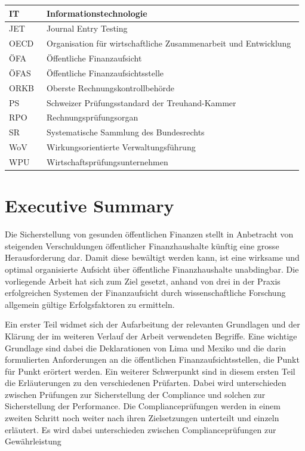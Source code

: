 \documentclass[10pt]{article}
\begin{document}
\begin{table}[h]
\begin{tabular}{|l|l|}
 \hline
 IT~ & Informationstechnologie~ \\
 \hline
 JET~ & Journal Entry Testing~ \\
 \hline
 OECD~ & Organisation für wirtschaftliche Zusammenarbeit und Entwicklung~ \\
 \hline
 ÖFA~ & Öffentliche Finanzaufsicht~ \\
 \hline
 ÖFAS~ & Öffentliche Finanzaufsichtsstelle~ \\
 \hline
 ORKB~ & Oberste Rechnungskontrollbehörde~ \\
 \hline
 PS~ & Schweizer Prüfungsstandard der Treuhand-Kammer~ \\
 \hline
 RPO~ & Rechnungsprüfungsorgan~ \\
 \hline
 SR~ & Systematische Sammlung des Bundesrechts~ \\
 \hline
 WoV~ & Wirkungsorientierte Verwaltungsführung~ \\
 \hline
 WPU~ & Wirtschaftsprüfungsunternehmen~ \\
 \hline
 \end{tabular}
\end{table}

\newpage
\section*{Executive Summary}\label{sec:executive_summary}
Die Sicherstellung von gesunden öffentlichen Finanzen stellt in Anbetracht von steigenden Verschuldungen öffentlicher Finanzhaushalte künftig eine grosse Herausforderung dar. Damit diese bewältigt werden kann, ist eine wirksame und optimal organisierte Aufsicht über öffentliche Finanzhaushalte unabdingbar. Die vorliegende Arbeit hat sich zum Ziel gesetzt, anhand von drei in der Praxis erfolgreichen Systemen der Finanzaufsicht durch wissenschaftliche Forschung allgemein gültige Erfolgsfaktoren zu ermitteln.

Ein erster Teil widmet sich der Aufarbeitung der relevanten Grundlagen und der Klärung der im weiteren Verlauf der Arbeit verwendeten Begriffe. Eine wichtige Grundlage sind dabei die Deklarationen von Lima und Mexiko und die darin formulierten Anforderungen an die öffentlichen Finanzaufsichtsstellen, die Punkt für Punkt erörtert werden. Ein weiterer Schwerpunkt sind in diesem ersten Teil die Erläuterungen zu den verschiedenen Prüfarten. Dabei wird unterschieden zwischen Prüfungen zur Sicherstellung der Compliance und solchen zur Sicherstellung der Performance. Die Complianceprüfungen werden in einem zweiten Schritt noch weiter nach ihren Zielsetzungen unterteilt und einzeln erläutert. Es wird dabei unterschieden zwischen Complianceprüfungen zur Gewährleistung
\end{document}
